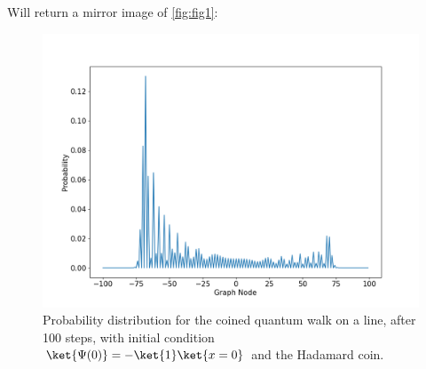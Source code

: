                 Will return a mirror image of \ref{fig:fig1}:
    	        \begin{figure}[!h]
                    \centering
                    \includegraphics[scale=0.40]{img/CoinedQuantumWalk/Coinedpsi01.png}
                    \caption{Probability distribution for the coined quantum walk on a line, after 100 steps, with initial condition $\ket{\Psi(0)}=-\ket{1}\ket{x=0}$ and the Hadamard coin.} 
                    \label{fig:fig2}
                \end{figure}
                
